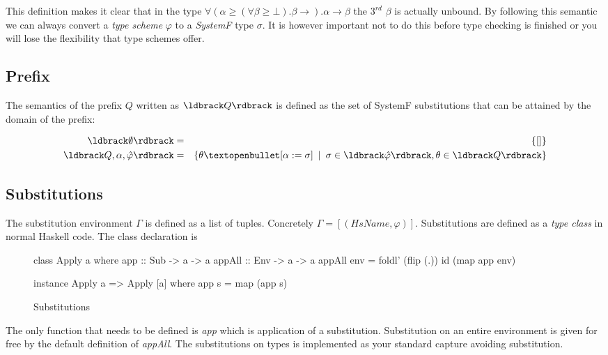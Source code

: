 This definition makes it clear that in the type $\forall(\alpha \geq (\forall \beta \geq \bot). \beta \rightarrow ). \alpha \rightarrow \beta$ the $3^{rd}$ $\beta$ is actually unbound. By following this semantic we can always convert a \emph{type scheme} $\varphi$ to a \emph{SystemF} type $\sigma$. It is however important not to do this before type checking is finished or you will lose the flexibility that type schemes offer.
\subsection{Prefix}
The semantics of the prefix $Q$ written as $\br{Q}$  is defined as the set of SystemF substitutions that can be attained by the domain of the prefix:

\begin{eqnarray*}
\br{\emptyset} & = & \{\lbrack\rbrack\} \\
\br{Q, \alpha, \hat{\varphi}} & = & \{ \theta \textopenbullet \lbrack \alpha := \sigma \rbrack \hspace{5pt} | \hspace{5pt} \sigma \in \br{\hat{\varphi}}, \theta \in \br{Q} \}
\end{eqnarray*}
\subsection{Substitutions}
The substitution environment $\Gamma$ is defined as a list of tuples. Concretely $\Gamma = [(HsName,\varphi)]$. Substitutions are defined as a \emph{type class} in normal Haskell code. The class declaration is

\begin{figure}[H]
\begin{code}
class Apply a where
  app    :: Sub -> a -> a
  appAll :: Env -> a -> a
  appAll env = foldl' (flip (.)) id (map app env)
  
instance Apply a => Apply [a] where
  app s = map (app s)
\end{code}
\label{utils:apply}
\caption{Substitutions}
\end{figure}
The only function that needs to be defined is \emph{app} which is application of a substitution. Substitution on an entire environment is given for free by the default definition of \emph{appAll}. 
The substitutions on types is implemented as your standard capture avoiding substitution.
